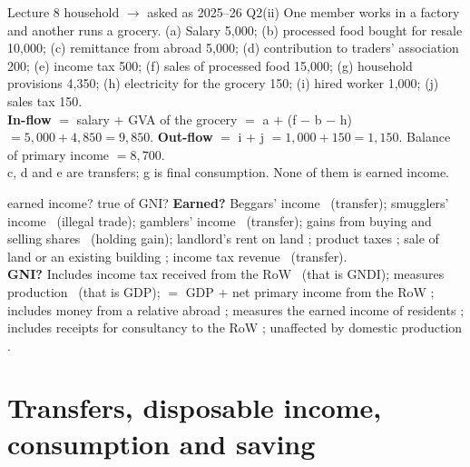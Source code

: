 \begin{tmpl}{Lecture 8 household $\to$ asked as 2025--26 Q2(ii)}
\small One member works in a factory and another runs a grocery. (a) Salary 5,000; (b) processed
food bought for resale 10,000; (c) remittance from abroad 5,000; (d) contribution to traders'
association 200; (e) income tax 500; (f) sales of processed food 15,000; (g) household provisions
4,350; (h) electricity for the grocery 150; (i) hired worker 1,000; (j) sales tax 150.\\
\textbf{In-flow} $=$ salary $+$ GVA of the grocery $=$ a $+$ (f $-$ b $-$ h) $=5{,}000+4{,}850=9{,}850$.
\textbf{Out-flow} $=$ i $+$ j $=1{,}000+150=1{,}150$. Balance of primary income $=8{,}700$.\\
c, d and e are transfers; g is final consumption. None of them is earned income.
\end{tmpl}

\begin{quick}{earned income? true of GNI?}
\small \textbf{Earned?} Beggars' income \no\ (transfer); smugglers' income \yes\ (illegal trade);
gamblers' income \no\ (transfer); gains from buying and selling shares \no\ (holding gain);
landlord's rent on land \yes; product taxes \yes; sale of land or an existing building \no; income
tax revenue \no\ (transfer).\\
\textbf{GNI?} Includes income tax received from the RoW \no\ (that is GNDI); measures production
\no\ (that is GDP); $=$ GDP $+$ net primary income from the RoW \yes; includes money from a
relative abroad \no; measures the earned income of residents \yes; includes receipts for
consultancy to the RoW \yes; unaffected by domestic production \no.
\end{quick}

\section{Transfers, disposable income, consumption and saving}\label{sec:di}

